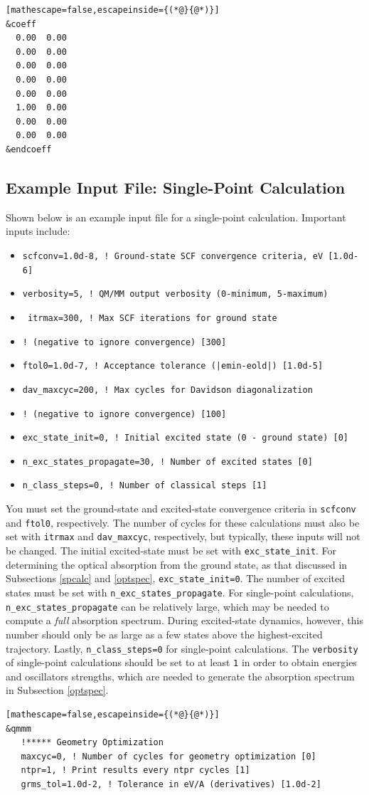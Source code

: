 \documentclass[letterpaper,12pt,titlepage]{article}
\begin{document}
\begin{appendix}
\begin{lstlisting}[mathescape=false,escapeinside={(*@}{@*)}]
&coeff
  0.00  0.00
  0.00  0.00
  0.00  0.00
  0.00  0.00
  0.00  0.00
  1.00  0.00
  0.00  0.00
  0.00  0.00
&endcoeff
\end{lstlisting}
\newpage
\subsection{Example Input File: Single-Point Calculation}
\label{input_spcalc}
Shown below is an example input file for a single-point calculation.  Important inputs include:
\begin{itemize}
\item \verb+scfconv=1.0d-8, ! Ground-state SCF convergence criteria, eV [1.0d-6]+
\item \verb+verbosity=5, ! QM/MM output verbosity (0-minimum, 5-maximum)+
\item \verb+ itrmax=300, ! Max SCF iterations for ground state+ 
\item[] \verb+! (negative to ignore convergence) [300]+
\item \verb+ftol0=1.0d-7, ! Acceptance tolerance (|emin-eold|) [1.0d-5]+
\item \verb+dav_maxcyc=200, ! Max cycles for Davidson diagonalization+
\item[] \verb+! (negative to ignore convergence) [100]+
\item \verb+exc_state_init=0, ! Initial excited state (0 - ground state) [0]+
\item \verb+n_exc_states_propagate=30, ! Number of excited states [0]+
\item \verb+n_class_steps=0, ! Number of classical steps [1]+
\end{itemize}
You must set the ground-state and excited-state convergence criteria in \verb+scfconv+ and \verb+ftol0+, respectively.  The number of cycles for these calculations must also be set with \verb+itrmax+ and \verb+dav_maxcyc+, respectively, but typically, these inputs will not be changed.  The initial excited-state must be set with \verb+exc_state_init+.  For determining the optical absorption from the ground state, as that discussed in Subsections \ref{spcalc} and \ref{optspec}, \verb+exc_state_init=0+.  The number of excited states must be set with \verb+n_exc_states_propagate+.  For single-point calculations, \verb+n_exc_states_propagate+ can be relatively large, which may be needed to compute a \textit{full} absorption spectrum.  During excited-state dynamics, however, this number should only be as large as a few states above the highest-excited trajectory.  Lastly, \verb+n_class_steps=0+ for single-point calculations.  The \verb+verbosity+ of single-point calculations should be set to at least \verb+1+ in order to obtain energies and oscillators strengths, which are needed to generate the absorption spectrum in Subsection \ref{optspec}.
\begin{lstlisting}[mathescape=false,escapeinside={(*@}{@*)}]
&qmmm
   !***** Geometry Optimization
   maxcyc=0, ! Number of cycles for geometry optimization [0]
   ntpr=1, ! Print results every ntpr cycles [1]
   grms_tol=1.0d-2, ! Tolerance in eV/A (derivatives) [1.0d-2]


\end{lstlisting}
\end{appendix}
\end{document}
